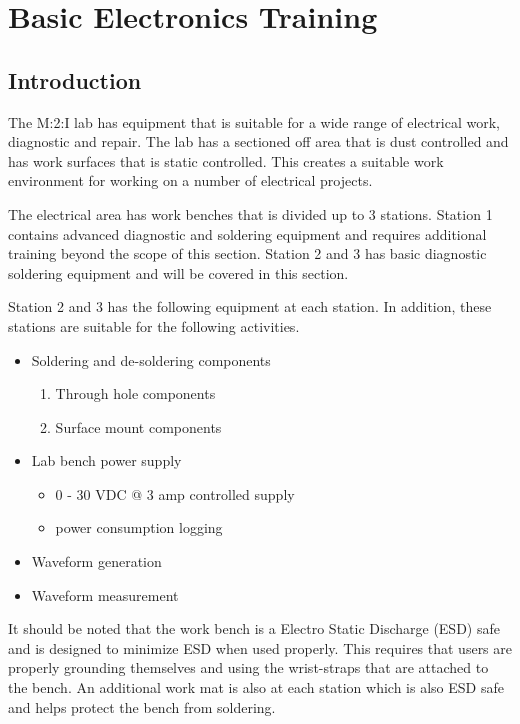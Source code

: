 
\chapter{Basic Electronics Training} \label{basic_electronics}
\section{Introduction}
The M:2:I lab has equipment that is suitable for a wide range of electrical work, diagnostic and repair.  The lab has a sectioned off area that is dust controlled and has work surfaces that is static controlled.  This creates a suitable work environment for working on a number of electrical projects.

The electrical area has work benches that is divided up to 3 stations.  Station 1 contains advanced diagnostic and soldering equipment and requires additional training beyond the scope of this section.  Station 2 and 3 has basic diagnostic soldering equipment and will be covered in this section.

Station 2 and 3 has the following equipment at each station.  In addition, these stations are suitable for the following activities.

\begin{itemize}
\item Soldering and de-soldering components
\begin{enumerate}
\item Through hole components
\item Surface mount components
\end{enumerate}
\item Lab bench power supply
\begin{itemize}
\item 0 - 30 VDC @ 3 amp controlled supply
\item power consumption logging
\end{itemize}
\item Waveform generation
\item Waveform measurement
\end{itemize}

It should be noted that the work bench is a Electro Static Discharge (ESD) safe and is designed to minimize ESD when used properly.  This requires that users are properly grounding themselves and using the wrist-straps that are attached to the bench.  An additional work mat is also at each station which is also ESD safe and helps protect the bench from soldering.

